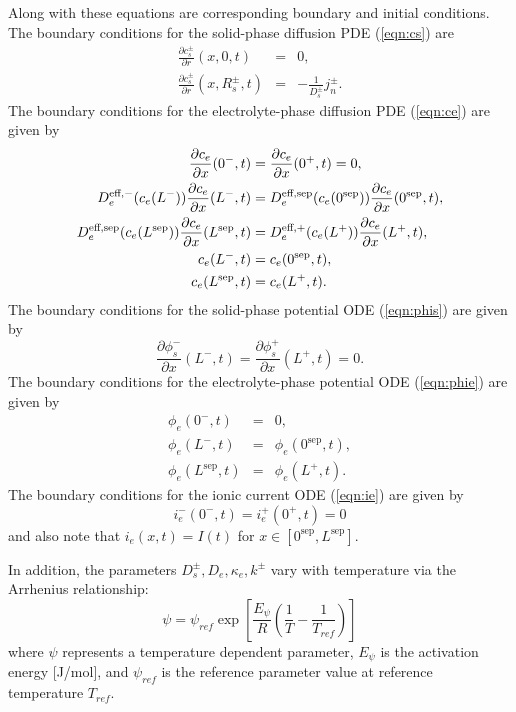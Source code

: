 \documentclass[12pt]{article}
\newcommand{\eff}{\text{eff}}
\newcommand{\pard}[2]{\frac{\partial #1}{\partial #2}}
\begin{document}
Along with these equations are corresponding boundary and initial conditions. The boundary conditions for the solid-phase diffusion PDE (\ref{eqn:cs}) are
\begin{eqnarray}
	\frac{\partial c_{s}^{\pm}}{\partial r}(x,0,t) &=& 0, \label{eqn:cs-bc1} \\
	\frac{\partial c_{s}^{\pm}}{\partial r}(x,R_{s}^{\pm},t) &=& -\frac{1}{D_{s}^{\pm}} j_{n}^{\pm} \label{eqn:cs-bc2}.
\end{eqnarray}
The boundary conditions for the electrolyte-phase diffusion PDE (\ref{eqn:ce}) are given by
\begin{align}
	\pard{c_{e}}{x}(0^{-},t) &= \pard{c_{e}}{x}(0^{+},t) = 0, \label{eqn:ce-bc1} \\
	D_{e}^{\eff,-}(c_e(L^{-})) \pard{c_{e}}{x}(L^{-},t) &= D_{e}^{\eff,\textrm{sep}}(c_e(0^{\textrm{sep}})) \pard{c_{e}}{x}(0^{\textrm{sep}},t), \\
	D_{e}^{\textrm{\eff,sep}}(c_e(L^{\textrm{sep}})) \pard{c_{e}}{x}(L^{\textrm{sep}},t) &= D_{e}^{\eff,+}(c_e(L^{+})) \pard{c_{e}}{x}(L^{+},t), \\
	c_{e}(L^{-},t) &= c_{e}(0^{\textrm{sep}},t), \\
	c_{e}(L^{\textrm{sep}},t) &= c_{e}(L^+,t). \label{eqn:ce-bc5}
\end{align}
The boundary conditions for the solid-phase potential ODE (\ref{eqn:phis}) are given by
\begin{equation}\label{eqn:phis-bc}
	\pard{\phi_{s}^{-}}{x}(L^{-},t) = \pard{\phi_{s}^{+}}{x}(L^{+},t) = 0.
\end{equation}
The boundary conditions for the electrolyte-phase potential ODE (\ref{eqn:phie}) are given by
\begin{eqnarray}
	\phi_{e}(0^{-},t) &=& 0, \\
	\phi_{e}(L^{-},t) &=& \phi_{e}(0^{\textrm{sep}},t), \\
	\phi_{e}(L^{\textrm{sep}},t) &=& \phi_{e}(L^+,t).
\end{eqnarray}
The boundary conditions for the ionic current ODE (\ref{eqn:ie}) are given by
\begin{equation}\label{eqn:ie-bcs}
	i_{e}^{-}(0^{-},t) = i_{e}^{+}(0^+,t) = 0
\end{equation}
and also note that $i_{e}(x,t) = I(t)$ for $x \in [0^{\textrm{sep}}, L^{\textrm{sep}}]$.

In addition, the parameters $D_s^{\pm}, D_e, \kappa_e, k^{\pm}$ vary with temperature via the Arrhenius relationship:
\begin{equation}\label{eqn:arrhenius}
	\psi = \psi_{ref} \exp \left[\frac{E_\psi}{R} \left( \frac{1}{T} - \frac{1}{T_{ref}} \right) \right]
\end{equation}
where $\psi$ represents a temperature dependent parameter, $E_{\psi}$ is the activation energy [J/mol], and $\psi_{ref}$ is the reference parameter value at reference temperature $T_{ref}$.
\end{document}

